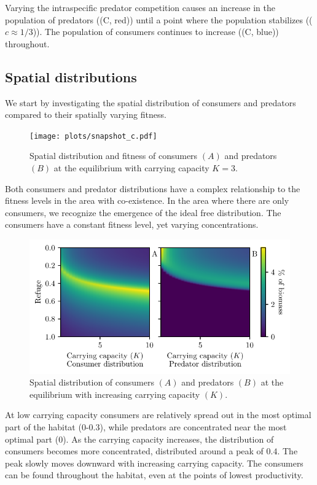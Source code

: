 Varying the intraspecific predator competition causes an increase in the population of predators ((C, red)) until a point where the population stabilizes (($c\approx 1/3$)). The population of consumers continues to increase ((C, blue)) throughout.


\subsection{Spatial distributions}
We start by investigating the spatial distribution of consumers and predators compared to their spatially varying fitness.
\begin{figure}[H]
  \caption{Spatial distribution and fitness of consumers $(A)$ and predators $(B)$ at the equilibrium with carrying capacity $K = 3$.}
  \label{fig:snapshot}
  \texttt{[image: plots/snapshot\_c.pdf]}
\end{figure}
Both consumers and predator distributions have a complex relationship to the fitness levels in the area with co-existence. In the area where there are only consumers, we recognize the emergence of the ideal free distribution. The consumers have a constant fitness level, yet varying concentrations. 

\begin{figure}[H]
  \caption{Spatial distribution of consumers $(A)$ and predators $(B)$ at the equilibrium with increasing carrying capacity $(K)$.}
  \label{fig:strat_car}
  \includegraphics{plots/increasing_car_cap_c.pdf}
\end{figure}

At low carrying capacity consumers are relatively spread out in the most optimal part of the habitat (0-0.3), while predators are concentrated near the most optimal part (0). As the carrying capacity increases, the distribution of consumers becomes more concentrated, distributed around a peak of $0.4$. The peak slowly moves downward with increasing carrying capacity. The consumers can be found throughout the habitat, even at the points of lowest productivity.



